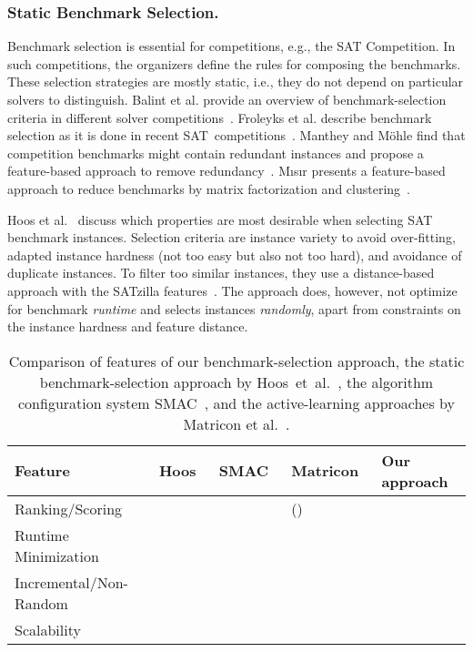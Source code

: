 \documentclass[runningheads]{llncs}
\newcommand{\cmark}{\ding{51}} %
\newcommand{\xmark}{\ding{55}}
\begin{document}
\subsubsection{Static Benchmark Selection.}

Benchmark selection is essential for competitions, e.g., the SAT Competition.
In such competitions, the organizers define the rules for composing the benchmarks.
These selection strategies are mostly static, i.e., they do not depend on particular solvers to distinguish.
Balint et al. provide an overview of benchmark-selection criteria in different solver competitions~\cite{balint2015overview}.
Froleyks et al. describe benchmark selection as it is done in recent SAT~competitions~\cite{FroleyksHIJS21}.
Manthey and Möhle find that competition benchmarks might contain redundant instances and propose a feature-based approach to remove redundancy~\cite{manthey2016better}.
M{\i}s{\i}r presents a feature-based approach to reduce benchmarks by matrix factorization and clustering~\cite{misir2021benchmark}.

Hoos et al.~\cite{HoosKSS13} discuss which properties are most desirable when selecting SAT benchmark instances.
Selection criteria are instance variety to avoid over-fitting, adapted instance hardness (not too easy but also not too hard), and avoidance of duplicate instances.
To filter too similar instances, they use a distance-based approach with the SATzilla features~\cite{XuHHL08,features}.
The approach does, however, not optimize for benchmark \emph{runtime} and selects instances \emph{randomly}, apart from constraints on the instance hardness and feature distance.

\begin{table}[tbp]
  \centering
  \begin{tabular}{
    m{}
    >{\centering\arraybackslash}m{}
    >{\centering\arraybackslash}m{}
    >{\centering\arraybackslash}m{}
    >{\centering\arraybackslash}m{}
  }
    \hline
    Feature & Hoos~\cite{HoosKSS13} & SMAC~\cite{HutterHL11} & Matricon~\cite{MatriconAFSH21} & Our approach \\
    \hline
    Ranking/Scoring & \cmark & \xmark & (\cmark) & \cmark \\
    Runtime Minimization & \xmark & \cmark & \cmark & \cmark \\
    Incremental/Non-Random & \xmark & \xmark & \cmark & \cmark \\
    Scalability & \cmark & \cmark & \xmark & \cmark \\
    \hline
  \end{tabular}
  ~\\[1em]
  \caption{Comparison of features of our benchmark-selection approach, the static benchmark-selection approach by Hoos~et~al.~\cite{HoosKSS13}, the algorithm configuration system SMAC~\cite{HutterHL11}, and the active-learning approaches by Matricon et al.~\cite{MatriconAFSH21}.
  }
  \label{tab:requirements}
\end{table}
\end{document}
